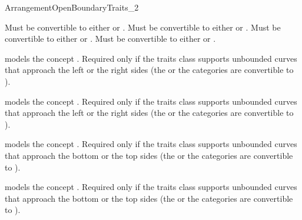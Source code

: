 \begin{ccRefConcept}{ArrangementOpenBoundaryTraits_2}
\ccRefines
{}


  {Must be convertible to either  or
        .}
  {Must be convertible to either  or
        .}
  {Must be convertible to either  or
        .}
  {Must be convertible to either  or
        .}

\ccThreeToTwo
{}%
  {models the concept .
  Required only if the traits class supports unbounded curves that
  approach the left or the right sides (the 
  or the  categories are convertible to
  ).}

\ccThreeToTwo
{}%
  {models the concept .
  Required only if the traits class supports unbounded curves that
  approach the left or the right sides (the 
  or the  categories are convertible to
  ).}

\ccThreeToTwo
{}%
  {models the concept .
  Required only if the traits class supports unbounded curves that
  approach the bottom or the top sides (the 
  or the  categories are convertible to
  ).}

\ccThreeToTwo
{}%
  {models the concept .
  Required only if the traits class supports unbounded curves that
  approach the bottom or the top sides (the 
  or the  categories are convertible to
  ).}
  

\end{ccRefConcept}
